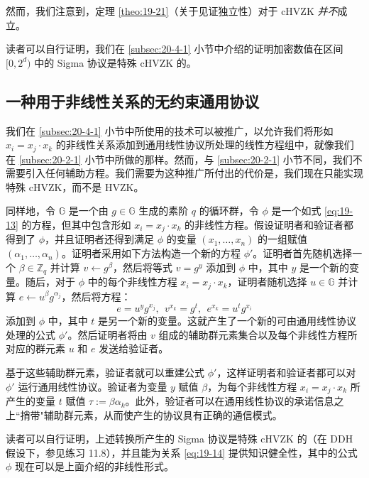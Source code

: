 然而，我们注意到，定理 \ref{theo:19-21}（关于见证独立性）对于 cHVZK \emph{并不}成立。

\begin{snote}[范围证明.]
读者可以自行证明，我们在 \ref{subsec:20-4-1} 小节中介绍的证明加密数值在区间 $[0,2^d)$ 中的 Sigma 协议是特殊 cHVZK 的。
\end{snote}

\subsection{一种用于非线性关系的无约束通用协议}\label{subsec:20-4-3}

我们在 \ref{subsec:20-4-1} 小节中所使用的技术可以被推广，以允许我们将形如 $x_i=x_j\cdot x_k$ 的非线性关系添加到通用线性协议所处理的线性方程组中，就像我们在 \ref{subsec:20-2-1} 小节中所做的那样。然而，与 \ref{subsec:20-2-1} 小节不同，我们不需要引入任何辅助方程。我们需要为这种推广所付出的代价是，我们现在只能实现特殊 cHVZK，而不是 HVZK。

同样地，令 $\mathbb G$ 是一个由 $g\in\mathbb{G}$ 生成的素阶 $q$ 的循环群，令 $\phi$ 是一个如式 \ref{eq:19-13} 的方程，但其中包含形如 $x_i=x_j\cdot x_k$ 的非线性方程。假设证明者和验证者都得到了 $\phi$，并且证明者还得到满足 $\phi$ 的变量 $(x_1,\dots,x_n)$ 的一组赋值 $(\alpha_1,\dots,\alpha_n)$。证明者采用如下方法构造一个新的方程 $\phi'$。证明者首先随机选择一个 $\beta\in\mathbb{Z}_q$ 并计算 $v\leftarrow g^\beta$，然后将等式 $v=g^y$ 添加到 $\phi$ 中，其中 $y$ 是一个新的变量。随后，对于 $\phi$ 中的每个非线性方程 $x_i=x_j\cdot x_k$，证明者随机选择 $u\in\mathbb{G}$ 并计算 $e\leftarrow u^\beta g^{\alpha_j}$，然后将方程：
\begin{equation}\label{eq:20-12}
e=u^yg^{x_j},~~
v^{x_k}=g^t,~~
e^{x_k}=u^tg^{x_i}
\end{equation}
添加到 $\phi$ 中，其中 $t$ 是另一个新的变量。这就产生了一个新的可由通用线性协议处理的公式 $\phi'$。然后证明者将由 $v$ 组成的辅助群元素集合以及每个非线性方程所对应的群元素 $u$ 和 $e$ 发送给验证者。

基于这些辅助群元素，验证者就可以重建公式 $\phi'$，这样证明者和验证者都可以对 $\phi'$ 运行通用线性协议。验证者为变量 $y$ 赋值 $\beta$，为每个非线性方程 $x_i=x_j\cdot x_k$ 所产生的变量 $t$ 赋值 $\tau:=\beta\alpha_k$。此外，验证者可以在通用线性协议的承诺信息之上``捎带"辅助群元素，从而使产生的协议具有正确的通信模式。

读者可以自行证明，上述转换所产生的 Sigma 协议是特殊 cHVZK 的（在 DDH 假设下，参见练习 11.8），并且能为关系 \ref{eq:19-14} 提供知识健全性，其中的公式 $\phi$ 现在可以是上面介绍的非线性形式。

